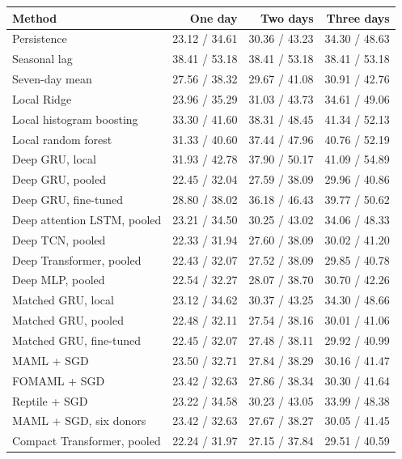 \begin{tabular}{lrrr}\toprule
Method & One day & Two days & Three days\\\midrule
Persistence & 23.12 / 34.61 & 30.36 / 43.23 & 34.30 / 48.63 \\
Seasonal lag & 38.41 / 53.18 & 38.41 / 53.18 & 38.41 / 53.18 \\
Seven-day mean & 27.56 / 38.32 & 29.67 / 41.08 & 30.91 / 42.76 \\
Local Ridge & 23.96 / 35.29 & 31.03 / 43.73 & 34.61 / 49.06 \\
Local histogram boosting & 33.30 / 41.60 & 38.31 / 48.45 & 41.34 / 52.13 \\
Local random forest & 31.33 / 40.60 & 37.44 / 47.96 & 40.76 / 52.19 \\
Deep GRU, local & 31.93 / 42.78 & 37.90 / 50.17 & 41.09 / 54.89 \\
Deep GRU, pooled & 22.45 / 32.04 & 27.59 / 38.09 & 29.96 / 40.86 \\
Deep GRU, fine-tuned & 28.80 / 38.02 & 36.18 / 46.43 & 39.77 / 50.62 \\
Deep attention LSTM, pooled & 23.21 / 34.50 & 30.25 / 43.02 & 34.06 / 48.33 \\
Deep TCN, pooled & 22.33 / 31.94 & 27.60 / 38.09 & 30.02 / 41.20 \\
Deep Transformer, pooled & 22.43 / 32.07 & 27.52 / 38.09 & 29.85 / 40.78 \\
Deep MLP, pooled & 22.54 / 32.27 & 28.07 / 38.70 & 30.70 / 42.26 \\
Matched GRU, local & 23.12 / 34.62 & 30.37 / 43.25 & 34.30 / 48.66 \\
Matched GRU, pooled & 22.48 / 32.11 & 27.54 / 38.16 & 30.01 / 41.06 \\
Matched GRU, fine-tuned & 22.45 / 32.07 & 27.48 / 38.11 & 29.92 / 40.99 \\
MAML + SGD & 23.50 / 32.71 & 27.84 / 38.29 & 30.16 / 41.47 \\
FOMAML + SGD & 23.42 / 32.63 & 27.86 / 38.34 & 30.30 / 41.64 \\
Reptile + SGD & 23.22 / 34.58 & 30.23 / 43.05 & 33.99 / 48.38 \\
MAML + SGD, six donors & 23.42 / 32.63 & 27.67 / 38.27 & 30.05 / 41.45 \\
Compact Transformer, pooled & 22.24 / 31.97 & 27.15 / 37.84 & 29.51 / 40.59 \\
\bottomrule\end{tabular}
